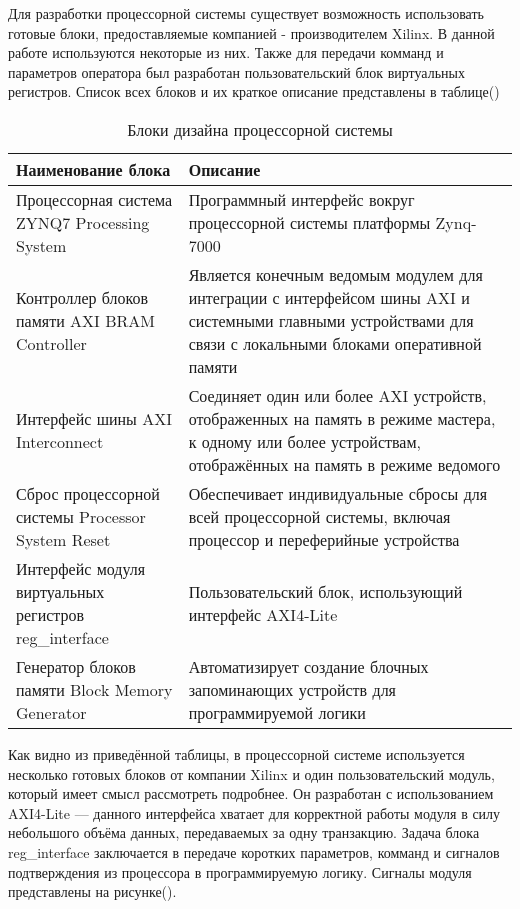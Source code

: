 Для разработки процессорной системы существует возможность использовать готовые блоки, предоставляемые компанией - производителем Xilinx. В данной работе используются некоторые из них. Также для передачи комманд и параметров оператора был разработан пользовательский блок виртуальных регистров. Список всех блоков и их краткое описание представлены в таблице()\par
\begin{table}[h!]
    \caption{Блоки дизайна процессорной системы}
    \begin{tabular}{|p{}|p{}|}
        \hline
        Наименование блока & Описание \\
        \hline
        Процессорная система ZYNQ7 Processing System & Программный интерфейс вокруг процессорной системы платформы Zynq-7000 \\
        \hline
        Контроллер блоков памяти AXI BRAM Controller & Является конечным ведомым модулем для интеграции с интерфейсом шины AXI и системными главными устройствами для связи с локальными блоками оперативной памяти \\
        \hline
        Интерфейс шины AXI Interconnect & Соединяет один или более AXI устройств, отображенных на память в режиме мастера, к одному или более устройствам, отображённых на память в режиме ведомого \\
        \hline
        Сброс процессорной системы Processor System Reset & Обеспечивает индивидуальные сбросы для всей процессорной системы, включая процессор и переферийные устройства \\
        \hline
        Интерфейс модуля виртуальных регистров reg\_interface & Пользовательский блок, использующий интерфейс AXI4-Lite \\
        \hline
        Генератор блоков памяти Block Memory Generator & Автоматизирует создание блочных запоминающих устройств для программируемой логики\\
        \hline
    \end{tabular}
\end{table}
Как видно из приведённой таблицы, в процессорной системе используется несколько готовых блоков от компании Xilinx и один пользовательский модуль, который имеет смысл рассмотреть подробнее. Он разработан с использованием AXI4-Lite --- данного интерфейса хватает для корректной работы модуля в силу небольшого объёма данных, передаваемых за одну транзакцию. Задача блока reg\_interface заключается в передаче коротких параметров, комманд и сигналов подтверждения из процессора в программируемую логику. Сигналы модуля представлены на рисунке().\par 
